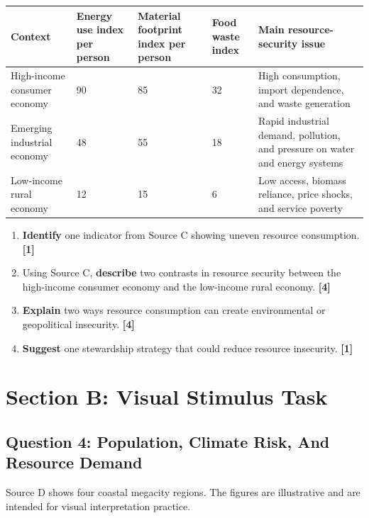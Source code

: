 \documentclass[11pt,a4paper]{article}
\newcommand{\exam}[1]{\textcolor{AccentTeal}{\textbf{#1}}}
\newcommand{\markpts}[1]{\hfill\textbf{[#1]}}
\begin{document}
\begin{tabularx}{\textwidth}{L{0.28\textwidth}C{0.16\textwidth}C{0.16\textwidth}C{0.16\textwidth}Y}
\toprule
\textbf{Context} & \textbf{Energy use index per person} &
\textbf{Material footprint index per person} & \textbf{Food waste index} &
\textbf{Main resource-security issue} \\
\midrule
High-income consumer economy & 90 & 85 & 32 & High consumption,
import dependence, and waste generation \\
Emerging industrial economy & 48 & 55 & 18 & Rapid industrial demand,
pollution, and pressure on water and energy systems \\
Low-income rural economy & 12 & 15 & 6 & Low access, biomass reliance,
price shocks, and service poverty \\
\bottomrule
\end{tabularx}

\begin{enumerate}[label=\textbf{3(\alph*)}]
  \item \exam{Identify} one indicator from Source C showing uneven resource
  consumption. \markpts{1}

  \item Using Source C, \exam{describe} two contrasts in resource security
  between the high-income consumer economy and the low-income rural economy.
  \markpts{4}

  \item \exam{Explain} two ways resource consumption can create environmental
  or geopolitical insecurity. \markpts{4}

  \item \exam{Suggest} one stewardship strategy that could reduce resource
  insecurity. \markpts{1}
\end{enumerate}

\newpage

\section{Section B: Visual Stimulus Task}

\subsection{Question 4: Population, Climate Risk, And Resource Demand}

Source D shows four coastal megacity regions. The figures are illustrative and
are intended for visual interpretation practice.
\end{document}
